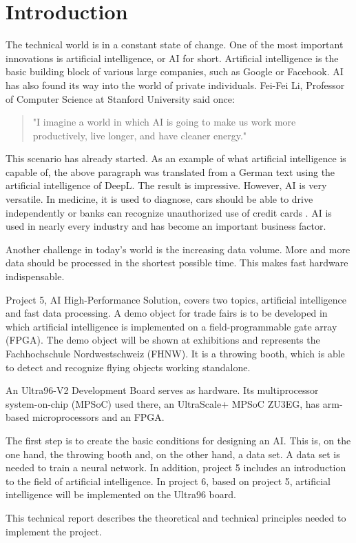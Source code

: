 \section{Introduction}
\label{sec:introduction}
The technical world is in a constant state of change. One of the most important innovations is artificial intelligence, or AI for short.
Artificial intelligence is the basic building block of various large companies, such as Google or Facebook.
AI has also found its way into the world of private individuals.
Fei-Fei Li, Professor of Computer Science at Stanford University said once:
\begin{quote}
	"I imagine a world in which AI is going to make us work more productively, live longer, and have cleaner energy."\cite{quotes_future}
\end{quote}
This scenario has already started. As an example of what artificial intelligence is capable of, the above paragraph was translated from a German text using the artificial intelligence of DeepL. The result is impressive.
However, AI is very versatile. In medicine, it is used to diagnose, cars should be able to drive independently or banks can recognize unauthorized use of credit cards \cite{artificial_intelligence_a_modern_approach}.
AI is used in nearly every industry and has become an important business factor.

Another challenge in today's world is the increasing data volume. More and more data should be processed in the shortest possible time. This makes fast hardware indispensable.

Project 5, AI High-Performance Solution, covers two topics, artificial intelligence and fast data processing.
A demo object for trade fairs is to be developed in which artificial intelligence is implemented on a field-programmable gate array (FPGA).
The demo object will be shown at exhibitions and represents the Fachhochschule Nordwestschweiz (FHNW).
It is a throwing booth, which is able to detect and recognize flying objects working standalone.

An Ultra96-V2 Development Board serves as hardware.
Its multiprocessor system-on-chip (MPSoC) used there, an UltraScale+ MPSoC ZU3EG, has arm-based microprocessors and an FPGA.

The first step is to create the basic conditions for designing an AI.
This is, on the one hand, the throwing booth and, on the other hand, a data set. A data set is needed to train a neural network.
In addition, project 5 includes an introduction to the field of artificial intelligence.
In project 6, based on project 5, artificial intelligence will be implemented on the Ultra96 board.

This technical report describes the theoretical and technical principles needed to implement the project.